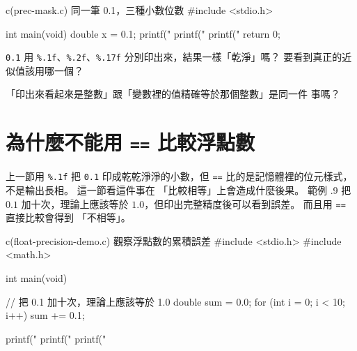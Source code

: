 \begin{example}{c}{(prec-mask.c) 同一筆 0.1，三種小數位數}
#include <stdio.h>

int main(void) {
    double x = 0.1;
    printf("%
    printf("%
    printf("%
    return 0;
}
\end{example}



\begin{drills}[label=drills:float-hidden-error]
\item \texttt{0.1} 用 \texttt{\%.1f}、\texttt{\%.2f}、\texttt{\%.17f}
分別印出來，結果一樣「乾淨」嗎？ 要看到真正的近似值該用哪一個？
\item 「印出來看起來是整數」跟「變數裡的值精確等於那個整數」是同一件
事嗎？
\end{drills}

\section{為什麼不能用 \texttt{==} 比較浮點數}
\label{sec:float-no-equality}

上一節用 \texttt{\%.1f} 把 \texttt{0.1} 印成乾乾淨淨的小數，但
\texttt{==} 比的是記憶體裡的位元樣式，不是輸出長相。 這一節看這件事在
「比較相等」上會造成什麼後果。 範例 \thechapter.9 把 $0.1$ 加十次，理論上應該等於
$1.0$，但印出完整精度後可以看到誤差。 而且用 \texttt{==} 直接比較會得到
「不相等」。

\begin{example}{c}{(float-precision-demo.c) 觀察浮點數的累積誤差}
#include <stdio.h>
#include <math.h>

int main(void) {
    // 把 0.1 加十次，理論上應該等於 1.0
    double sum = 0.0;
    for (int i = 0; i < 10; i++) {
        sum += 0.1;
    }

    printf("%
    printf("%
    printf("%
}
\end{example}


